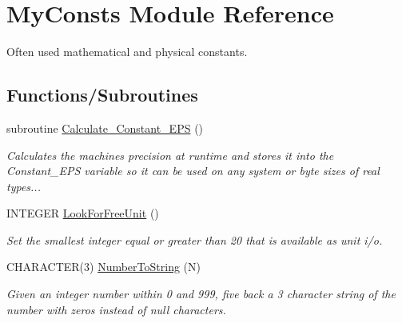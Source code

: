 \hypertarget{namespace_my_consts}{
\section{MyConsts Module Reference}
\label{namespace_my_consts}
}


Often used mathematical and physical constants.  
\subsection*{Functions/Subroutines}
\begin{DoxyCompactItemize}
\item 
subroutine \hyperlink{namespace_my_consts_a30010b124d6326386412e65f9673b934}{Calculate\_\-Constant\_\-EPS} ()
\begin{DoxyCompactList}\small\item\em Calculates the machines precision at runtime and stores it into the Constant\_\-EPS variable so it can be used on any system or byte sizes of real types... \item\end{DoxyCompactList}\item 
INTEGER \hyperlink{namespace_my_consts_a093b1ea96b1aa71b483171f830362952}{LookForFreeUnit} ()
\begin{DoxyCompactList}\small\item\em Set the smallest integer equal or greater than 20 that is available as unit i/o. \item\end{DoxyCompactList}\item 
CHARACTER(3) \hyperlink{namespace_my_consts_a48c07e594adf4fa6121bcd79c799145b}{NumberToString} (N)
\begin{DoxyCompactList}\small\item\em Given an integer number within 0 and 999, five back a 3 character string of the number with zeros instead of null characters. \item\end{DoxyCompactList}\end{DoxyCompactItemize}
